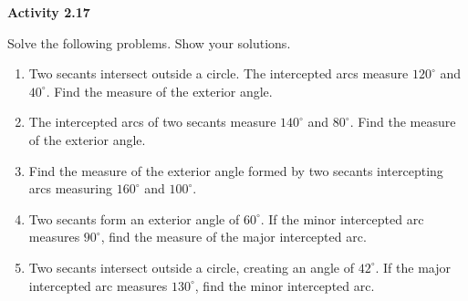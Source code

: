 \vspace{0.3ex}
\noindent\textbf{Activity 2.17}

\vspace{0.2ex}

Solve the following problems. Show your solutions.

\begin{enumerate}
    \item Two secants intersect outside a circle. The intercepted arcs measure $120^\circ$ and $40^\circ$. Find the measure of the exterior angle.
    \item The intercepted arcs of two secants measure $140^\circ$ and $80^\circ$. Find the measure of the exterior angle.
    \item Find the measure of the exterior angle formed by two secants intercepting arcs measuring $160^\circ$ and $100^\circ$.
    \item Two secants form an exterior angle of $60^\circ$. If the minor intercepted arc measures $90^\circ$, find the measure of the major intercepted arc.
    \item Two secants intersect outside a circle, creating an angle of $42^\circ$. If the major intercepted arc measures $130^\circ$, find the minor intercepted arc.
\end{enumerate}

